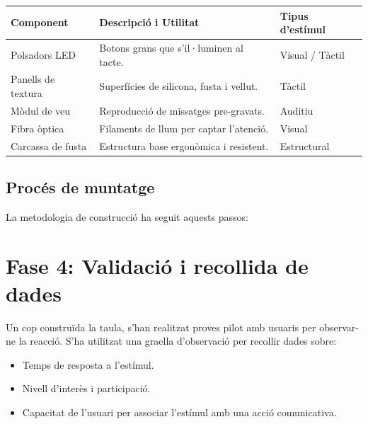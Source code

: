 \begin{center}
    \renewcommand{\arraystretch}{1.5}
    \begin{tabularx}{\textwidth}{l X l}
        \rowcolor{SoftBlue!30}
        \textbf{Component} & \textbf{Descripció i Utilitat} & \textbf{Tipus d'estímul} \\ \toprule
        Polsadors LED & Botons grans que s'il·luminen al tacte. & Visual / Tàctil \\
        Panells de textura & Superfícies de silicona, fusta i vellut. & Tàctil \\
        Mòdul de veu & Reproducció de missatges pre-gravats. & Auditiu \\
        Fibra òptica & Filaments de llum per captar l'atenció. & Visual \\
        Carcassa de fusta & Estructura base ergonòmica i resistent. & Estructural \\ \bottomrule
    \end{tabularx}
\end{center}

\subsection{Procés de muntatge}
La metodologia de construcció ha seguit aquests passos:

\section{Fase 4: Validació i recollida de dades}
Un cop construïda la taula, s'han realitzat proves pilot amb usuaris per observar-ne la reacció. S'ha utilitzat una graella d'observació per recollir dades sobre:
\begin{itemize}
    \item Temps de resposta a l'estímul.
    \item Nivell d'interès i participació.
    \item Capacitat de l'usuari per associar l'estímul amb una acció comunicativa.
\end{itemize}
